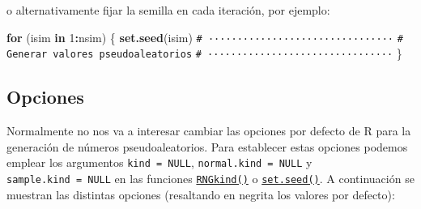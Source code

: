 \documentclass[
  spanish,
  10pt,
]{book}
\newenvironment{Shaded}{\begin{snugshade}}{\end{snugshade}}
\newcommand{\CommentTok}[1]{\textcolor[rgb]{0.56,0.35,0.01}{\textit{#1}}}
\newcommand{\ControlFlowTok}[1]{\textcolor[rgb]{0.13,0.29,0.53}{\textbf{#1}}}
\newcommand{\DecValTok}[1]{\textcolor[rgb]{0.00,0.00,0.81}{#1}}
\newcommand{\FunctionTok}[1]{\textcolor[rgb]{0.13,0.29,0.53}{\textbf{#1}}}
\newcommand{\NormalTok}[1]{#1}
\newcommand{\SpecialCharTok}[1]{\textcolor[rgb]{0.81,0.36,0.00}{\textbf{#1}}}
\theoremstyle{break}
\theoremstyle{nonumberplain}
\renewcommand{\CommentTok}[1]{\textcolor[rgb]{0.41,0.41,0.41}{\texttt{#1}}}
\begin{document}
o alternativamente fijar la semilla en cada iteración, por ejemplo:

\begin{Shaded}
\begin{Highlighting}[]
\ControlFlowTok{for}\NormalTok{ (isim }\ControlFlowTok{in} \DecValTok{1}\SpecialCharTok{:}\NormalTok{nsim) \{}
  \FunctionTok{set.seed}\NormalTok{(isim)}
  \CommentTok{\# ································}
  \CommentTok{\# Generar valores pseudoaleatorios}
  \CommentTok{\# ································}
\NormalTok{\}}
\end{Highlighting}
\end{Shaded}

\subsection{Opciones}\label{oprrng}

Normalmente no nos va a interesar cambiar las opciones por defecto de R para la generación de números pseudoaleatorios.
Para establecer estas opciones podemos emplear los argumentos \texttt{kind\ =\ NULL}, \texttt{normal.kind\ =\ NULL} y \texttt{sample.kind\ =\ NULL} en las funciones \href{https://rdrr.io/r/base/Random.html}{\texttt{RNGkind()}} o \href{https://rdrr.io/r/base/Random.html}{\texttt{set.seed()}}.
A continuación se muestran las distintas opciones (resaltando en negrita los valores por defecto):
\end{document}
